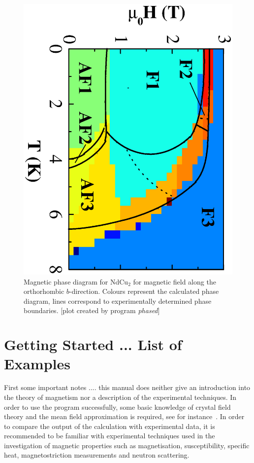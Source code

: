 \documentclass[twoside]{article}
\newcommand{\prg}{\sl}
\begin{document}
\begin{figure}[ht]\begin{center}
\includegraphics[angle=90,width=0.7\columnwidth]{figsrc/ndphased.ps}
\caption{\label{ndphased}
Magnetic phase diagram for NdCu$_2$ for magnetic field along
the orthorhombic $b$-direction. Colours represent the calculated phase
diagram, lines correspond to experimentally determined phase boundaries.
[plot created by program {\prg phased}]
}
\end{center}
\end{figure}


\section{Getting Started ... List of Examples}  

First some important notes .... this manual does neither give an introduction into the theory of 
magnetism nor a description of the experimental techniques. In order
to use the program successfully, some basic knowledge of crystal field theory and the mean field
approximation is required, see for instance~\cite{jensen91-1}.
In order to compare the output of the calculation with experimental
data, it is recommended to be familiar with  experimental techniques used
in the investigation of magnetic properties
such as magnetisation, susceptibility, specific heat, magnetostriction
measurements and neutron scattering.
\end{document}
